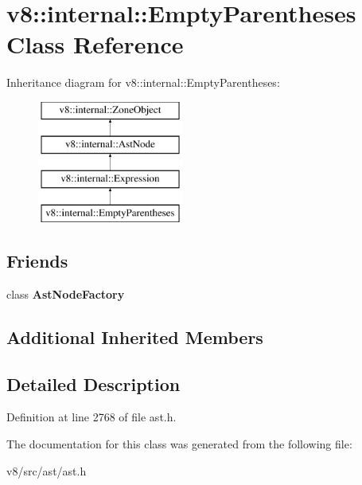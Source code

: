 \hypertarget{classv8_1_1internal_1_1EmptyParentheses}{}\section{v8\+:\+:internal\+:\+:Empty\+Parentheses Class Reference}
\label{classv8_1_1internal_1_1EmptyParentheses}
Inheritance diagram for v8\+:\+:internal\+:\+:Empty\+Parentheses\+:\begin{figure}[H]
\begin{center}
\leavevmode
\includegraphics[height=4.000000cm]{classv8_1_1internal_1_1EmptyParentheses}
\end{center}
\end{figure}
\subsection*{Friends}
\begin{DoxyCompactItemize}
\item 
\mbox{\label{classv8_1_1internal_1_1EmptyParentheses_a8d587c8ad3515ff6433eb83c578e795f}} 
class {\bfseries Ast\+Node\+Factory}
\end{DoxyCompactItemize}
\subsection*{Additional Inherited Members}


\subsection{Detailed Description}


Definition at line 2768 of file ast.\+h.



The documentation for this class was generated from the following file\+:\begin{DoxyCompactItemize}
\item 
v8/src/ast/ast.\+h\end{DoxyCompactItemize}
